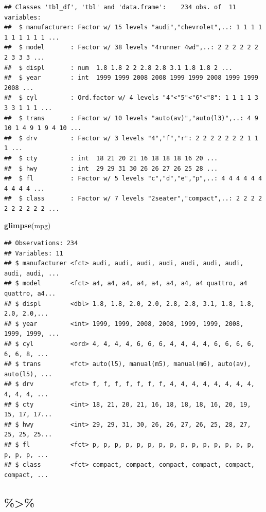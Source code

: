 \documentclass[]{tufte-book}
\newenvironment{Shaded}{}{}
\newcommand{\KeywordTok}[1]{\textcolor[rgb]{0.00,0.44,0.13}{\textbf{#1}}}
\newcommand{\NormalTok}[1]{#1}
\begin{document}
\begin{verbatim}
## Classes 'tbl_df', 'tbl' and 'data.frame':    234 obs. of  11 variables:
##  $ manufacturer: Factor w/ 15 levels "audi","chevrolet",..: 1 1 1 1 1 1 1 1 1 1 ...
##  $ model       : Factor w/ 38 levels "4runner 4wd",..: 2 2 2 2 2 2 2 3 3 3 ...
##  $ displ       : num  1.8 1.8 2 2 2.8 2.8 3.1 1.8 1.8 2 ...
##  $ year        : int  1999 1999 2008 2008 1999 1999 2008 1999 1999 2008 ...
##  $ cyl         : Ord.factor w/ 4 levels "4"<"5"<"6"<"8": 1 1 1 1 3 3 3 1 1 1 ...
##  $ trans       : Factor w/ 10 levels "auto(av)","auto(l3)",..: 4 9 10 1 4 9 1 9 4 10 ...
##  $ drv         : Factor w/ 3 levels "4","f","r": 2 2 2 2 2 2 2 1 1 1 ...
##  $ cty         : int  18 21 20 21 16 18 18 18 16 20 ...
##  $ hwy         : int  29 29 31 30 26 26 27 26 25 28 ...
##  $ fl          : Factor w/ 5 levels "c","d","e","p",..: 4 4 4 4 4 4 4 4 4 4 ...
##  $ class       : Factor w/ 7 levels "2seater","compact",..: 2 2 2 2 2 2 2 2 2 2 ...
\end{verbatim}

\begin{Shaded}
\begin{Highlighting}[]
\KeywordTok{glimpse}\NormalTok{(mpg)}
\end{Highlighting}
\end{Shaded}

\begin{verbatim}
## Observations: 234
## Variables: 11
## $ manufacturer <fct> audi, audi, audi, audi, audi, audi, audi, audi, audi, ...
## $ model        <fct> a4, a4, a4, a4, a4, a4, a4, a4 quattro, a4 quattro, a4...
## $ displ        <dbl> 1.8, 1.8, 2.0, 2.0, 2.8, 2.8, 3.1, 1.8, 1.8, 2.0, 2.0,...
## $ year         <int> 1999, 1999, 2008, 2008, 1999, 1999, 2008, 1999, 1999, ...
## $ cyl          <ord> 4, 4, 4, 4, 6, 6, 6, 4, 4, 4, 4, 6, 6, 6, 6, 6, 6, 8, ...
## $ trans        <fct> auto(l5), manual(m5), manual(m6), auto(av), auto(l5), ...
## $ drv          <fct> f, f, f, f, f, f, f, 4, 4, 4, 4, 4, 4, 4, 4, 4, 4, 4, ...
## $ cty          <int> 18, 21, 20, 21, 16, 18, 18, 18, 16, 20, 19, 15, 17, 17...
## $ hwy          <int> 29, 29, 31, 30, 26, 26, 27, 26, 25, 28, 27, 25, 25, 25...
## $ fl           <fct> p, p, p, p, p, p, p, p, p, p, p, p, p, p, p, p, p, p, ...
## $ class        <fct> compact, compact, compact, compact, compact, compact, ...
\end{verbatim}

\hypertarget{section}{%
\subsection{\%\textgreater\%}\label{section}}
\end{document}
